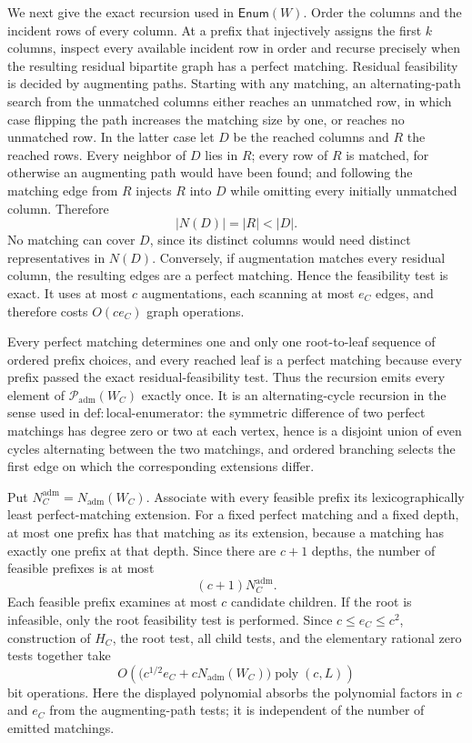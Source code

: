 We next give the exact recursion used in \(\mathsf{Enum}(W)\).  Order the columns and the incident rows of every column.  At a prefix that injectively assigns the first \(k\) columns, inspect every available incident row in order and recurse precisely when the resulting residual bipartite graph has a perfect matching.  Residual feasibility is decided by augmenting paths.  Starting with any matching, an alternating-path search from the unmatched columns either reaches an unmatched row, in which case flipping the path increases the matching size by one, or reaches no unmatched row.  In the latter case let \(D\) be the reached columns and \(R\) the reached rows.  Every neighbor of \(D\) lies in \(R\); every row of \(R\) is matched, for otherwise an augmenting path would have been found; and following the matching edge from \(R\) injects \(R\) into \(D\) while omitting every initially unmatched column.  Therefore
\[
 |N(D)|=|R|<|D|.
\]
No matching can cover \(D\), since its distinct columns would need distinct representatives in \(N(D)\).  Conversely, if augmentation matches every residual column, the resulting edges are a perfect matching.  Hence the feasibility test is exact.  It uses at most \(c\) augmentations, each scanning at most \(e_C\) edges, and therefore costs \(O(ce_C)\) graph operations.

Every perfect matching determines one and only one root-to-leaf sequence of ordered prefix choices, and every reached leaf is a perfect matching because every prefix passed the exact residual-feasibility test.  Thus the recursion emits every element of \(\mathcal P_{\mathrm{adm}}(W_C)\) exactly once.  It is an alternating-cycle recursion in the sense used in \(\mathrm{def:local\mbox{-}enumerator}\): the symmetric difference of two perfect matchings has degree zero or two at each vertex, hence is a disjoint union of even cycles alternating between the two matchings, and ordered branching selects the first edge on which the corresponding extensions differ.

Put \(N_C^{\mathrm{adm}}=N_{\mathrm{adm}}(W_C)\).  Associate with every feasible prefix its lexicographically least perfect-matching extension.  For a fixed perfect matching and a fixed depth, at most one prefix has that matching as its extension, because a matching has exactly one prefix at that depth.  Since there are \(c+1\) depths, the number of feasible prefixes is at most
\[
 (c+1)N_C^{\mathrm{adm}}.
\]
Each feasible prefix examines at most \(c\) candidate children.  If the root is infeasible, only the root feasibility test is performed.  Since \(c\le e_C\le c^2\), construction of \(H_C\), the root test, all child tests, and the elementary rational zero tests together take
\[
 O\!\left(\bigl(c^{1/2}e_C+cN_{\mathrm{adm}}(W_C)\bigr)
          \operatorname{poly}(c,L)\right)
\]
bit operations.  Here the displayed polynomial absorbs the polynomial factors in \(c\) and \(e_C\) from the augmenting-path tests; it is independent of the number of emitted matchings.

